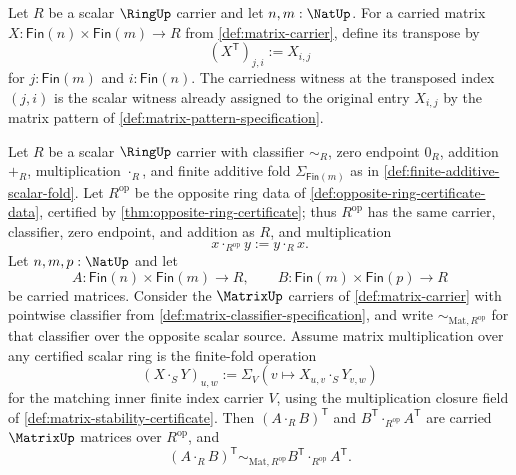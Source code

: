 \begin{definition}
\label{def:matrix-transpose-certified-scalar-carrier}
Let $R$ be a scalar $\RingUp$ carrier and let $n,m:\NatUp$. For a carried matrix $X:\mathsf{Fin}(n)\times\mathsf{Fin}(m)\to R$ from \autoref{def:matrix-carrier}, define its transpose by
$$
(X^{\mathsf{T}})_{j,i}:=X_{i,j}
$$
for $j:\mathsf{Fin}(m)$ and $i:\mathsf{Fin}(n)$. The carriedness witness at the transposed index $(j,i)$ is the scalar witness already assigned to the original entry $X_{i,j}$ by the matrix pattern of \autoref{def:matrix-pattern-specification}.
\end{definition}

\begin{theorem}
\label{thm:matrix-transpose-reverses-product-over-opposite-ring}
Let $R$ be a scalar $\RingUp$ carrier with classifier $\sim_R$, zero endpoint $0_R$, addition $+_R$, multiplication $\cdot_R$, and finite additive fold $\Sigma_{\mathsf{Fin}(m)}$ as in \autoref{def:finite-additive-scalar-fold}. Let $R^{\mathrm{op}}$ be the opposite ring data of \autoref{def:opposite-ring-certificate-data}, certified by \autoref{thm:opposite-ring-certificate}; thus $R^{\mathrm{op}}$ has the same carrier, classifier, zero endpoint, and addition as $R$, and multiplication
$$
x\cdot_{R^{\mathrm{op}}}y:=y\cdot_Rx.
$$
Let $n,m,p:\NatUp$ and let
$$
A:\mathsf{Fin}(n)\times\mathsf{Fin}(m)\to R,
\qquad
B:\mathsf{Fin}(m)\times\mathsf{Fin}(p)\to R
$$
be carried matrices. Consider the $\MatrixUp$ carriers of \autoref{def:matrix-carrier} with pointwise classifier from \autoref{def:matrix-classifier-specification}, and write $\sim_{\mathrm{Mat},R^{\mathrm{op}}}$ for that classifier over the opposite scalar source. Assume matrix multiplication over any certified scalar ring is the finite-fold operation
$$
(X\cdot_S Y)_{u,w}:=\Sigma_V(v\mapsto X_{u,v}\cdot_SY_{v,w})
$$
for the matching inner finite index carrier $V$, using the multiplication closure field of \autoref{def:matrix-stability-certificate}. Then $(A\cdot_RB)^{\mathsf{T}}$ and $B^{\mathsf{T}}\cdot_{R^{\mathrm{op}}}A^{\mathsf{T}}$ are carried $\MatrixUp$ matrices over $R^{\mathrm{op}}$, and
$$
(A\cdot_RB)^{\mathsf{T}}
\sim_{\mathrm{Mat},R^{\mathrm{op}}}
B^{\mathsf{T}}\cdot_{R^{\mathrm{op}}}A^{\mathsf{T}}.
$$
\end{theorem}

